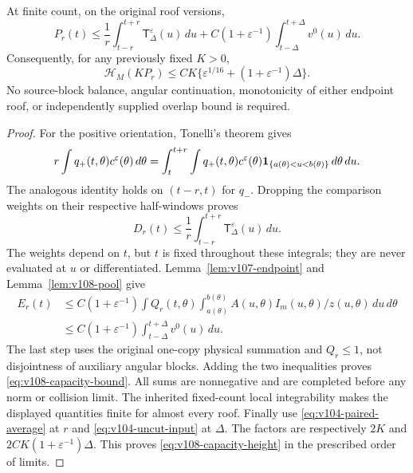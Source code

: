 \begin{theorem}
\label{thm:v108-pool}
At finite count, on the original roof versions,
\begin{equation}\label{eq:v108-capacity-bound}
 P_r(t)\le \frac1r\int_{t-r}^{t+r}\mathsf T_\Delta^\varepsilon(u)\,du
       +C(1+\varepsilon^{-1})\int_{t-\Delta}^{t+\Delta}v^0(u)\,du.
\end{equation}
Consequently, for any previously fixed $K>0$,
\begin{equation}\label{eq:v108-capacity-height}
 \mathcal H_M(KP_r)\le
 CK\{\varepsilon^{1/16}+(1+\varepsilon^{-1})\Delta\}.
\end{equation}
No source-block balance, angular continuation, monotonicity of either
endpoint roof, or independently supplied overlap bound is required.
\end{theorem}
\begin{proof}
For the positive orientation, Tonelli's theorem gives
\[
 r\int q_+(t,\theta)c^\varepsilon(\theta)\,d\theta
 =\int_t^{t+r}\int q_+(t,\theta)c^\varepsilon(\theta)
                  \mathbf1_{\{a(\theta)<u<b(\theta)\}}\,d\theta\,du.
\]
The analogous identity holds on $(t-r,t)$ for $q_-$. Dropping the
comparison weights on their respective half-windows proves
\[
 D_r(t)\le\frac1r\int_{t-r}^{t+r}
                         \mathsf T_\Delta^\varepsilon(u)\,du.
\]
The weights depend on $t$, but $t$ is fixed throughout these
integrals; they are never evaluated at $u$ or differentiated.
Lemma~\ref{lem:v107-endpoint} and
Lemma~\ref{lem:v108-pool} give
\begin{align*}
 E_r(t)&\le C(1+\varepsilon^{-1})
   \int Q_r(t,\theta)\int_{a(\theta)}^{b(\theta)}
                 A(u,\theta)I_m(u,\theta)/z(u,\theta)\,du\,d\theta\\
 &\le C(1+\varepsilon^{-1})
                         \int_{t-\Delta}^{t+\Delta}v^0(u)\,du.
\end{align*}
The last step uses the original one-copy physical summation and
$Q_r\le1$, not disjointness of auxiliary angular blocks. Adding the
two inequalities proves \eqref{eq:v108-capacity-bound}.
All sums are nonnegative and are completed before any norm or
collision limit. The inherited fixed-count local integrability makes
the displayed quantities finite for almost every roof. Finally use
\eqref{eq:v104-paired-average} at $r$ and
\eqref{eq:v104-uncut-input} at $\Delta$. The factors are respectively
$2K$ and $2CK(1+\varepsilon^{-1})\Delta$. This proves
\eqref{eq:v108-capacity-height} in the prescribed order of limits.
\end{proof}

